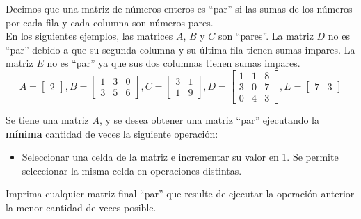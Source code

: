 %


Decimos que una matriz de números enteros es ``par'' si las sumas de los números por cada fila  y cada columna son números pares.\\

En los siguientes ejemplos, las matrices $A$, $B$ y $C$ son ``pares''. La matriz $D$ no es ``par'' debido a que su segunda columna y su última fila tienen sumas impares. La matriz $E$ no es ``par'' ya que sus dos columnas tienen sumas impares.\\

\begin{equation*}
  A =
  \begin{bmatrix}
    2
  \end{bmatrix},
  B =
  \begin{bmatrix}
    1 & 3 & 0 \\
    3 & 5 & 6
  \end{bmatrix},
  C =
  \begin{bmatrix}
    3 & 1 \\
    1 & 9
  \end{bmatrix},
  D =
  \begin{bmatrix}
    1 & 1 & 8 \\
    3 & 0 & 7 \\
    0 & 4 & 3
  \end{bmatrix},
  E =
  \begin{bmatrix}
    7 & 3
  \end{bmatrix}
\end{equation*}

Se tiene una matriz $A$, y se desea obtener una matriz ``par'' ejecutando la \textbf{mínima} cantidad de veces la siguiente operación:\\
\begin{itemize}
  \item Seleccionar una celda de la matriz e incrementar su valor en 1. Se permite seleccionar la misma celda en operaciones distintas.
\end{itemize}

Imprima cualquier matriz final ``par'' que resulte de ejecutar la operación anterior la menor cantidad de veces posible.

%
%


